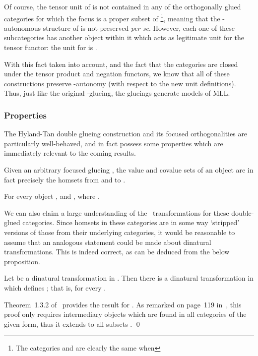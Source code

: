 \documentclass{LMCS}
\theoremstyle{plain}\newtheorem*{cLm}{Claim}
\newcommand{\mll}{MLL} \newcommand{\mall}{MALL}
\newcommand{\p}{} \newcommand{\N}{\mathbb{N}}
\newcommand{\hughc}[1]{#1}
\begin{document}
\p Of course, the tensor unit  of  is not contained in any of the orthogonally glued categories for which the focus is a proper subset of \footnote{The categories  and  are clearly the same when }, meaning that the -autonomous structure of  is not preserved \textit{per se}. However, each one of these subcategories has another object within it which acts as legitimate unit for the tensor functor: the unit for  is .

\p With this fact taken into account, and the fact that the categories are closed under the tensor product and negation functors, we know that all of these constructions preserve {-autonomy} (with respect to the new unit definitions). Thus, just like the original -glueing, the glueings generate models of \mll.

\subsubsection{Properties}

The Hyland-Tan double glueing construction and its focused orthogonalities are particularly well-behaved, and in fact possess some properties which are immediately relevant to the coming results.

\pagebreak Given an arbitrary focused glueing , the value and covalue sets of an object are in fact precisely the homsets from  and to .

\begin{fact}{\cite{Ste13}} \label{CoValueArrowProp}
For every object ,  and , where .
\end{fact}






We can also claim a large understanding of the ~transformations for these double-glued categories. Since homsets in these categories are in some way `stripped' versions of those from their underlying categories, it would be reasonable to assume that an analogous statement could be made about dinatural transformations. This is indeed correct, as can be deduced from the below proposition.

\begin{prop}{\cite{Tan97,Ste13}} \label{PropGPreservesDNTs}
Let  be a dinatural transformation in . Then there is a dinatural transformation  in  which defines ; that is,  for every . \end{prop}
\proof
\hughc{Theorem~1.3.2 of~\cite{Tan97} provides the result for . As remarked on page~119 in~\cite{Ste13}, this proof only requires intermediary objects which are found in all categories of the given form, thus it extends to all subsets .} \qed
\end{document}
